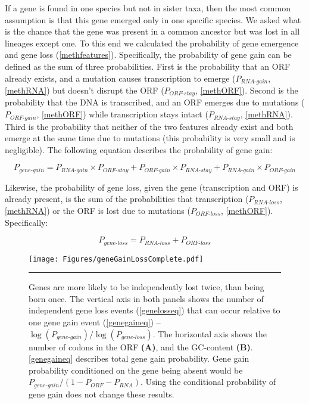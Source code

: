 \documentclass[12pt,a4paper]{article}
\begin{document}
If a gene is found in one species but not in sister taxa, then the most common assumption is that this gene emerged only in one specific species. We asked what is the chance that the gene was present in a common ancestor but was lost in all lineages except one. To this end we calculated the probability of gene emergence and gene loss (\autoref{methfeatures}). Specifically, the probability of gene gain can be defined as the sum of three probabilities. First is the probability that an ORF already exists, and a mutation causes transcription to emerge ($P_\textit{RNA-gain}$, \autoref{methRNA}) but doesn't disrupt the ORF ($P_\textit{ORF-stay}$, \autoref{methORF}). Second is the probability that the DNA is transcribed, and an ORF emerges due to mutations ($P_\textit{ORF-gain}$, \autoref{methORF}) while transcription stays intact ($P_\textit{RNA-stay}$, \autoref{methRNA}). Third is the probability that neither of the two features already exist and both emerge at the same time due to mutations (this probability is very small and is negligible). The following equation describes the probability of gene gain:

\begin{equation}
P_\textit{gene-gain} = P_\textit{RNA-gain} \times P_\textit{ORF-stay} + P_\textit{ORF-gain} \times P_\textit{RNA-stay} + P_\textit{RNA-gain}\times P_\textit{ORF-gain}
\label{genegaineq}
\end{equation}

Likewise, the probability of gene loss, given the gene (transcription and ORF) is already present, is the sum of the probabilities that transcription ($P_\textit{RNA-loss}$, \autoref{methRNA}) or the ORF is lost due to mutations ($P_\textit{ORF-loss}$, \autoref{methORF}). Specifically:

\begin{equation}
P_\textit{gene-loss} = P_\textit{RNA-loss} + P_\textit{ORF-loss}
\label{genelosseq}
\end{equation}

\begin{figure}[!t]
\centering
\texttt{[image: Figures/geneGainLossComplete.pdf]}
\caption{Genes are more likely to be independently lost twice, than being born once. The vertical axis in both panels shows the number of independent gene loss events (\autoref{genelosseq}) that can occur relative to one gene gain event (\autoref{genegaineq}) -- $\log(P_\textit{gene-gain})/\log(P_\textit{gene-loss})$. The horizontal axis shows the number of codons in the ORF \textbf{(A)}, and the GC-content \textbf{(B)}. \autoref{genegaineq} describes total gene gain probability. Gene gain probability conditioned on the gene being absent would be $P_\textit{gene-gain}/(1-P_\textit{ORF} - P_\textit{RNA})$. Using the conditional probability of gene gain does not change these results.}
\label{gainlossprob}
\vspace{1ex}
\hrule
\end{figure}
\end{document}
